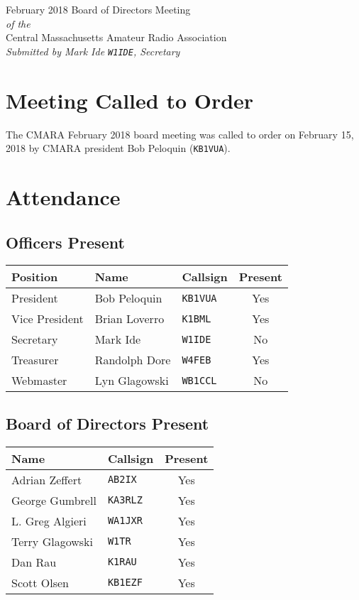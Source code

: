 \documentclass[10pt,letterpaper]{article}
\begin{document}
\begin{center}
{\huge February 2018 Board of Directors Meeting}\\
\emph{of the}\\
{\Large Central Massachusetts Amateur Radio Association}\\
\emph{Submitted by Mark Ide \texttt{W1IDE}, Secretary}
\end{center}

\section{Meeting Called to Order}
The CMARA February 2018 board meeting was called to order on February 15, 2018 by CMARA president Bob Peloquin (\texttt{KB1VUA}).

\section{Attendance}

\subsection{Officers Present}
\begin{tabular}{|l|l|l|c|}
  \hline
  \textbf{Position} & \textbf{Name}  & \textbf{Callsign} & \textbf{Present} \\ \hline
  President         & Bob Peloquin   & \texttt{KB1VUA}   & Yes  \\
  Vice President    & Brian Loverro  & \texttt{K1BML}    & Yes \\
  Secretary         & Mark Ide       & \texttt{W1IDE}    & No \\
  Treasurer         & Randolph Dore  & \texttt{W4FEB}    & Yes \\
  Webmaster         & Lyn Glagowski  & \texttt{WB1CCL}   & No  \\
  \hline
\end{tabular}

\subsection{Board of Directors Present}
\begin{tabular}{|l|l|c|}
  \hline
  \textbf{Name}   & \textbf{Callsign} & \textbf{Present} \\ \hline
  Adrian Zeffert  & \texttt{AB2IX}    &  Yes \\ \hline
  George Gumbrell & \texttt{KA3RLZ}   &  Yes \\ \hline
  L. Greg Algieri & \texttt{WA1JXR}   &  Yes \\ \hline
  Terry Glagowski & \texttt{W1TR}     &  Yes \\ \hline
  Dan Rau         & \texttt{K1RAU}    &  Yes \\ \hline
  Scott Olsen     & \texttt{KB1EZF}   &  Yes \\ \hline
\end{tabular}\\
\end{document}
